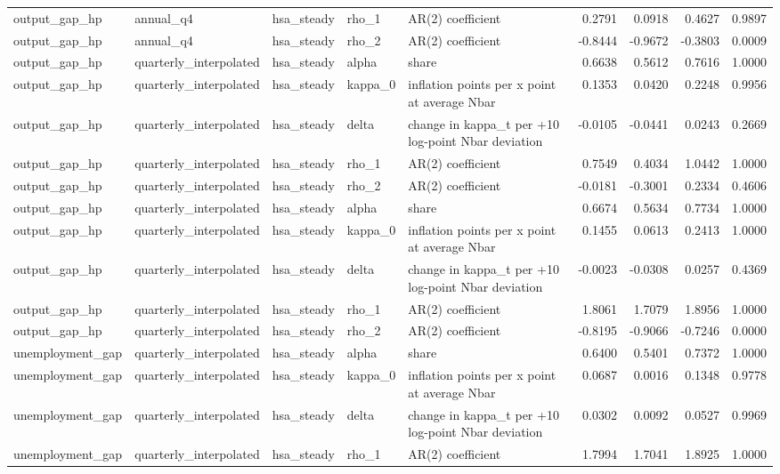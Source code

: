 \begin{tabular}{lllllrrrr}
output\_gap\_hp & annual\_q4 & hsa\_steady & rho\_1 & AR(2) coefficient & 0.2791 & 0.0918 & 0.4627 & 0.9897 \\
output\_gap\_hp & annual\_q4 & hsa\_steady & rho\_2 & AR(2) coefficient & -0.8444 & -0.9672 & -0.3803 & 0.0009 \\
output\_gap\_hp & quarterly\_interpolated & hsa\_steady & alpha & share & 0.6638 & 0.5612 & 0.7616 & 1.0000 \\
output\_gap\_hp & quarterly\_interpolated & hsa\_steady & kappa\_0 & inflation points per x point at average Nbar & 0.1353 & 0.0420 & 0.2248 & 0.9956 \\
output\_gap\_hp & quarterly\_interpolated & hsa\_steady & delta & change in kappa\_t per +10 log-point Nbar deviation & -0.0105 & -0.0441 & 0.0243 & 0.2669 \\
output\_gap\_hp & quarterly\_interpolated & hsa\_steady & rho\_1 & AR(2) coefficient & 0.7549 & 0.4034 & 1.0442 & 1.0000 \\
output\_gap\_hp & quarterly\_interpolated & hsa\_steady & rho\_2 & AR(2) coefficient & -0.0181 & -0.3001 & 0.2334 & 0.4606 \\
output\_gap\_hp & quarterly\_interpolated & hsa\_steady & alpha & share & 0.6674 & 0.5634 & 0.7734 & 1.0000 \\
output\_gap\_hp & quarterly\_interpolated & hsa\_steady & kappa\_0 & inflation points per x point at average Nbar & 0.1455 & 0.0613 & 0.2413 & 1.0000 \\
output\_gap\_hp & quarterly\_interpolated & hsa\_steady & delta & change in kappa\_t per +10 log-point Nbar deviation & -0.0023 & -0.0308 & 0.0257 & 0.4369 \\
output\_gap\_hp & quarterly\_interpolated & hsa\_steady & rho\_1 & AR(2) coefficient & 1.8061 & 1.7079 & 1.8956 & 1.0000 \\
output\_gap\_hp & quarterly\_interpolated & hsa\_steady & rho\_2 & AR(2) coefficient & -0.8195 & -0.9066 & -0.7246 & 0.0000 \\
unemployment\_gap & quarterly\_interpolated & hsa\_steady & alpha & share & 0.6400 & 0.5401 & 0.7372 & 1.0000 \\
unemployment\_gap & quarterly\_interpolated & hsa\_steady & kappa\_0 & inflation points per x point at average Nbar & 0.0687 & 0.0016 & 0.1348 & 0.9778 \\
unemployment\_gap & quarterly\_interpolated & hsa\_steady & delta & change in kappa\_t per +10 log-point Nbar deviation & 0.0302 & 0.0092 & 0.0527 & 0.9969 \\
unemployment\_gap & quarterly\_interpolated & hsa\_steady & rho\_1 & AR(2) coefficient & 1.7994 & 1.7041 & 1.8925 & 1.0000 \\

\end{tabular}
